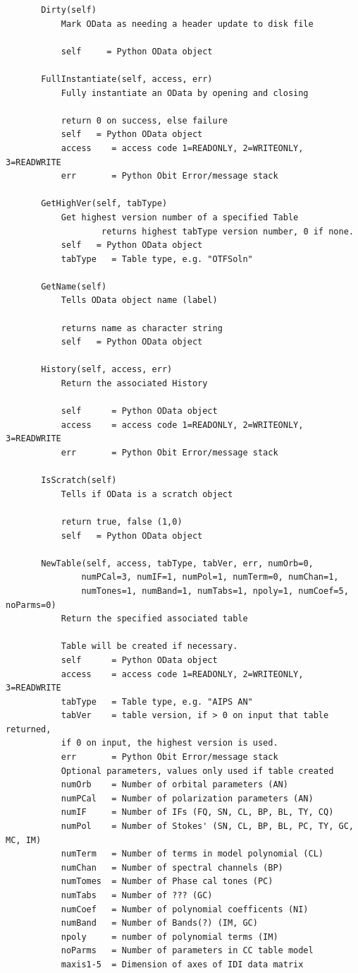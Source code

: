 \documentclass[11pt]{report}
\begin{document}
\begin{verbatim}
       Dirty(self)
           Mark OData as needing a header update to disk file
           
           self     = Python OData object
       
       FullInstantiate(self, access, err)
           Fully instantiate an OData by opening and closing
           
           return 0 on success, else failure
           self   = Python OData object
           access    = access code 1=READONLY, 2=WRITEONLY, 3=READWRITE
           err       = Python Obit Error/message stack
       
       GetHighVer(self, tabType)
           Get highest version number of a specified Table
                   returns highest tabType version number, 0 if none.
           self   = Python OData object
           tabType   = Table type, e.g. "OTFSoln"
       
       GetName(self)
           Tells OData object name (label)
           
           returns name as character string
           self   = Python OData object
       
       History(self, access, err)
           Return the associated History
           
           self      = Python OData object
           access    = access code 1=READONLY, 2=WRITEONLY, 3=READWRITE
           err       = Python Obit Error/message stack
       
       IsScratch(self)
           Tells if OData is a scratch object
           
           return true, false (1,0)
           self   = Python OData object
       
       NewTable(self, access, tabType, tabVer, err, numOrb=0,
               numPCal=3, numIF=1, numPol=1, numTerm=0, numChan=1, 
               numTones=1, numBand=1, numTabs=1, npoly=1, numCoef=5, noParms=0)
           Return the specified associated table
           
           Table will be created if necessary.
           self      = Python OData object
           access    = access code 1=READONLY, 2=WRITEONLY, 3=READWRITE
           tabType   = Table type, e.g. "AIPS AN"
           tabVer    = table version, if > 0 on input that table returned,
           if 0 on input, the highest version is used.
           err       = Python Obit Error/message stack
           Optional parameters, values only used if table created
           numOrb    = Number of orbital parameters (AN)
           numPCal   = Number of polarization parameters (AN)
           numIF     = Number of IFs (FQ, SN, CL, BP, BL, TY, CQ)
           numPol    = Number of Stokes' (SN, CL, BP, BL, PC, TY, GC, MC, IM)
           numTerm   = Number of terms in model polynomial (CL)
           numChan   = Number of spectral channels (BP)
           numTomes  = Number of Phase cal tones (PC)
           numTabs   = Number of ??? (GC)
           numCoef   = Number of polynomial coefficents (NI)
           numBand   = Number of Bands(?) (IM, GC)
           npoly     = number of polynomial terms (IM)
           noParms   = Number of parameters in CC table model
           maxis1-5  = Dimension of axes of IDI data matrix
       

\end{verbatim}
\end{document}
